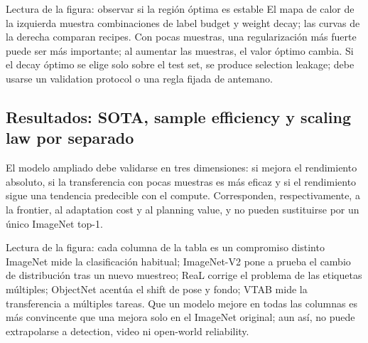 
\begin{knowledgebox}{Lectura de la figura: observar si la región óptima es estable}
El mapa de calor de la izquierda muestra combinaciones de label budget y weight decay; las curvas de la derecha comparan recipes. Con pocas muestras, una regularización más fuerte puede ser más importante; al aumentar las muestras, el valor óptimo cambia. Si el decay óptimo se elige solo sobre el test set, se produce selection leakage; debe usarse un validation protocol o una regla fijada de antemano.
\end{knowledgebox}

\subsection{Resultados: SOTA, sample efficiency y scaling law por separado}

El modelo ampliado debe validarse en tres dimensiones: si mejora el rendimiento absoluto, si la transferencia con pocas muestras es más eficaz y si el rendimiento sigue una tendencia predecible con el compute. Corresponden, respectivamente, a la frontier, al adaptation cost y al planning value, y no pueden sustituirse por un único ImageNet top-1.


\begin{knowledgebox}{Lectura de la figura: cada columna de la tabla es un compromiso distinto}
ImageNet mide la clasificación habitual; ImageNet-V2 pone a prueba el cambio de distribución tras un nuevo muestreo; ReaL corrige el problema de las etiquetas múltiples; ObjectNet acentúa el shift de pose y fondo; VTAB mide la transferencia a múltiples tareas. Que un modelo mejore en todas las columnas es más convincente que una mejora solo en el ImageNet original; aun así, no puede extrapolarse a detection, video ni open-world reliability.
\end{knowledgebox}


